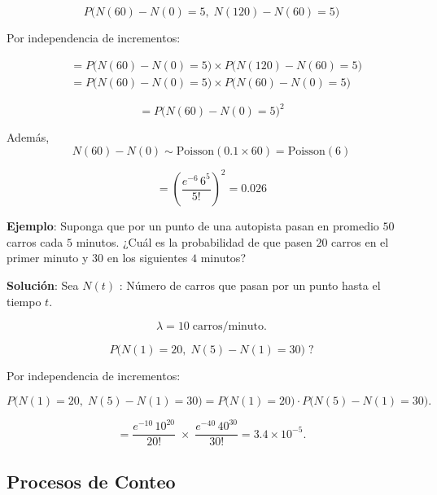 \documentclass[12pt,a4paper]{article}
\begin{document}
\begin{equation*}
P\big(N(60) - N(0) = 5,\; N(120) - N(60) = 5\big)
\end{equation*}

Por independencia de incrementos:

\begin{align*}
&= P\big(N(60) - N(0) = 5\big) \times P\big(N(120) - N(60) = 5\big) \\
&= P\big(N(60) - N(0) = 5\big) \times P\big(N(60) - N(0) = 5\big)
\end{align*}

\begin{equation*}
= P\big(N(60) - N(0) = 5\big)^2
\end{equation*}

Además,
\begin{equation*}
N(60) - N(0) \sim \text{Poisson}(0.1 \times 60) = \text{Poisson}(6)
\end{equation*}

\begin{equation*}
= \left( \frac{e^{-6} \, 6^5}{5!} \right)^2 = 0.026
\end{equation*}

\textbf{Ejemplo}: Suponga que por un punto de una autopista pasan en promedio $50$ carros cada $5$ minutos. ¿Cuál es la probabilidad de que pasen $20$ carros en el primer minuto y $30$ en los siguientes $4$ minutos?

\textbf{Solución}: Sea $N(t)$ : Número de carros que pasan por un punto hasta el tiempo $t$.

\begin{equation*}
\lambda = 10 \; \text{carros/minuto}.
\end{equation*}

\begin{equation*}
P\big(N(1)=20,\; N(5)-N(1)=30\big)\; ?
\end{equation*}

Por independencia de incrementos:

\begin{equation*}
P\big(N(1)=20,\; N(5)-N(1)=30\big)
= P\big(N(1)=20\big)\cdot P\big(N(5)-N(1)=30\big).
\end{equation*}

\begin{equation*}
= \frac{e^{-10}\,10^{20}}{20!} \; \times \; \frac{e^{-40}\,40^{30}}{30!}
= 3.4 \times 10^{-5}.
\end{equation*}

\subsection{Procesos de Conteo}
\end{document}
